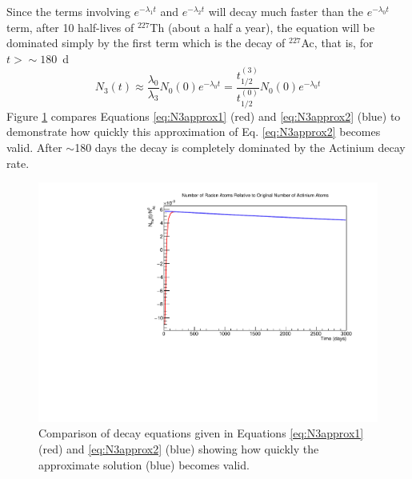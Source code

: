 \documentclass[11pt]{article}
\begin{document}
Since the terms involving $e^{-\lambda_1t}$ and $e^{-\lambda_2t}$ will decay much faster than the $e^{-\lambda_0t}$ term, after 10 half-lives of $^{227}$Th (about a half a year), the equation will be dominated simply by the first term which is the decay of $^{227}$Ac, that is, for $t>\sim 180$~d
\begin{equation}
\label{eq:N3approx2}
N_3(t)\approx\frac{\lambda_0}{\lambda_3}N_0(0)e^{-\lambda_0t}=\frac{t^{(3)}_{1/2}}{t^{(0)}_{1/2}}N_0(0)e^{-\lambda_0t}
\end{equation}
Figure \ref{fig:approx} compares Equations \ref{eq:N3approx1} (red) and \ref{eq:N3approx2} (blue) to demonstrate how quickly this approximation of Eq. \ref{eq:N3approx2} becomes valid. After $\sim$180 days the decay is completely dominated by the Actinium decay rate.
\begin{figure}[h]
\label{fig:approx}
\centering\includegraphics[width=0.8\linewidth]{NRadonvst}
\caption{Comparison of decay equations given in Equations \ref{eq:N3approx1} (red) and \ref{eq:N3approx2} (blue) showing how quickly the approximate solution (blue) becomes valid.}
\end{figure}
\end{document}
